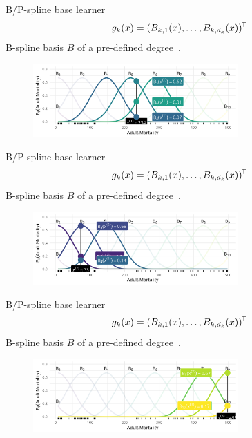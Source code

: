 
\begin{frame}{B/P-spline base learner}
  \vspace{-0.3cm}\[g_k(x) = (B_{k,1}(x), \dots, B_{k,d_k}(x))^{\mkern-1.5mu\mathsf{T}}\] B-spline basis $B$ of a pre-defined degree~\citep{eilers1996flexible}.
  \begin{center}
    \begin{figure}
      \includegraphics[width=0.7\textwidth]{figures/bs-base/fig-bs1.png}
    \end{figure}
  \end{center}
  
  
\end{frame}


\begin{frame}{B/P-spline base learner}
  \vspace{-0.3cm}\[g_k(x) = (B_{k,1}(x), \dots, B_{k,d_k}(x))^{\mkern-1.5mu\mathsf{T}}\] B-spline basis $B$ of a pre-defined degree~\citep{eilers1996flexible}.
  \begin{center}
    \begin{figure}
      \includegraphics[width=0.7\textwidth]{figures/bs-base/fig-bs59.png}
    \end{figure}
  \end{center}
  
  \addtocounter{framenumber}{-1}
\end{frame}


\begin{frame}{B/P-spline base learner}
  \vspace{-0.3cm}\[g_k(x) = (B_{k,1}(x), \dots, B_{k,d_k}(x))^{\mkern-1.5mu\mathsf{T}}\] B-spline basis $B$ of a pre-defined degree~\citep{eilers1996flexible}.
  \begin{center}
    \begin{figure}
      \includegraphics[width=0.7\textwidth]{figures/bs-base/fig-bs40.png}
    \end{figure}
  \end{center}
  
  \addtocounter{framenumber}{-1}
\end{frame}


